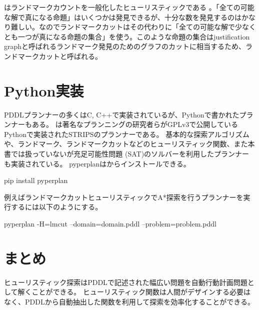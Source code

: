 はランドマークカウントを一般化したヒューリスティックである \cite{helmert:09}。「全ての可能な解で真になる命題」はいくつかは発見できるが、十分な数を発見するのはかなり難しい。なのでランドマークカットはその代わりに「全ての可能な解で少なくとも一つが真になる命題の集合」を使う。このような命題の集合はjustification graphと呼ばれるランドマーク発見のためのグラフのカットに相当するため、ランドマークカットと呼ばれる。



\section{Python実装}

PDDLプランナーの多くはC, C++で実装されているが、Pythonで書かれたプランナーもある。
は著名なプランニングの研究者らがGPLv3で公開しているPythonで実装されたSTRIPSのプランナーである。
基本的な探索アルゴリズムや、ランドマーク、ランドマークカットなどのヒューリスティック関数、また本書では扱っていないが充足可能性問題 (SAT)のソルバーを利用したプランナーも実装されている。
pyperplanはからインストールできる。

\begin{python}
pip install pyperplan
\end{python}

例えばランドマークカットヒューリスティックでA*探索を行うプランナーを実行するには以下のようにする。

\begin{python}
pyperplan -H=lmcut --domain=domain.pddl --problem=problem.pddl
\end{python}

\section{まとめ}

ヒューリスティック探索はPDDLで記述された幅広い問題を自動行動計画問題として解くことができる。
ヒューリスティック関数は人間がデザインする必要はなく、PDDLから自動抽出した関数を利用して探索を効率化することができる。


